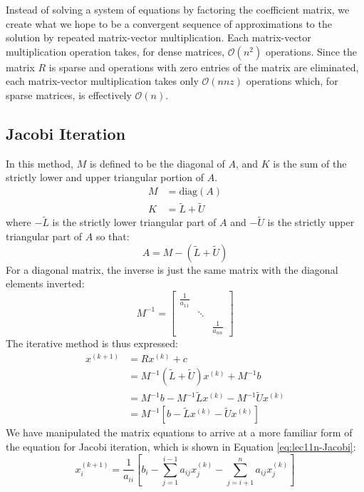 Instead of solving a system of equations by factoring the coefficient matrix, we create what we hope to be a convergent sequence of approximations to the solution by repeated matrix-vector multiplication.  Each matrix-vector multiplication operation takes, for dense matrices, $\mathcal{O}(n^2)$ operations.  Since the matrix $R$ is sparse and operations with zero entries of the matrix are eliminated, each matrix-vector multiplication takes only $\mathcal{O}(nnz)$ operations which, for sparse matrices, is effectively $\mathcal{O}(n)$.

\subsection{Jacobi Iteration}

In this method, $M$ is defined to be the diagonal of $A$, and $K$ is the sum of the strictly lower and upper triangular portion of $A$.\cite{demmel1997applied}
\begin{align}
M &= \text{diag}(A) \\
K &= \tilde{L} + \tilde{U}
\end{align}
where $-\tilde{L}$ is the strictly lower triangular part of $A$ and $-\tilde{U}$ is the strictly upper triangular part of $A$ so that:
\begin{equation*}
A = M - (\tilde{L} + \tilde{U})
\end{equation*}
For a diagonal matrix, the inverse is just the same matrix with the diagonal elements inverted:
\begin{equation*}
M^{-1} = \left[
\begin{matrix}
\frac{1}{a_{11}} & &  \\
 & \ddots & \\
 & & \frac{1}{a_{nn}} 
 \end{matrix}
\right]
\end{equation*}
The iterative method is thus expressed:
\begin{align*}
x^{(k+1)} &= Rx^{(k)} + c \\
&=M^{-1}(\tilde{L} + \tilde{U})x^{(k)} + M^{-1}b \\
&=M^{-1}b - M^{-1}\tilde{L}x^{(k)} - M^{-1}\tilde{U}x^{(k)} \\
&=M^{-1}\left[b - \tilde{L}x^{(k)} - \tilde{U}x^{(k)}\right]
\end{align*}
We have manipulated the matrix equations to arrive at a more familiar form of the equation for Jacobi iteration, which is shown in Equation \ref{eq:lec11n-Jacobi}:
\begin{equation}
x_i^{(k+1)} = \frac{1}{a_{ii}}\left[b_{i} - \sum\limits_{j=1}^{i-1}a_{ij}x_{j}^{(k)} - \sum\limits_{j=i+1}^{n}a_{ij}x_j^{(k)} \right]
\label{eq:lec11n-Jacobi}
\end{equation}
